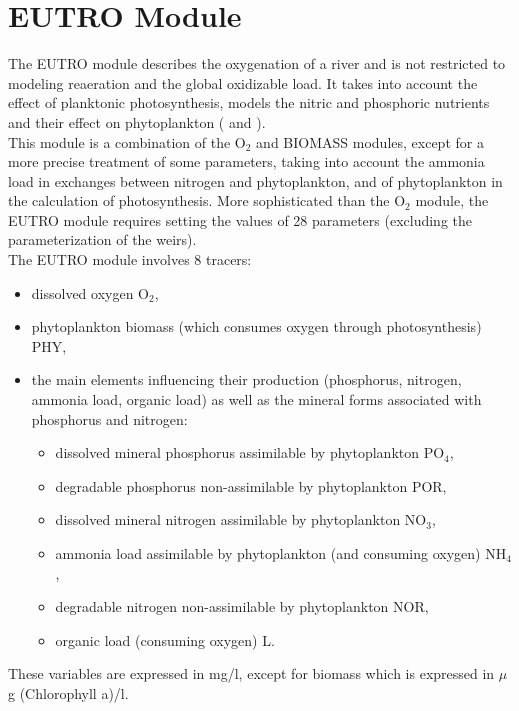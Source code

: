\chapter{EUTRO Module}

The EUTRO module describes the oxygenation of a river and
is not restricted to modeling reaeration and the global oxidizable load.
It takes into account the effect of planktonic photosynthesis,
models the nitric and phosphoric nutrients and their effect
on phytoplankton (\cite{gosse_doubs_1989} and \cite{gosse_doubs_1983}).\\

This module is a combination of the O$_2$ and BIOMASS modules,
except for a more precise treatment of some parameters,
taking into account the ammonia load in exchanges between nitrogen and phytoplankton,
and of phytoplankton in the calculation of photosynthesis.
More sophisticated than the O$_2$ module, the EUTRO module requires setting
the values of 28 parameters (excluding the parameterization of the weirs).\\

The EUTRO module involves 8 tracers:

\begin{itemize}
\item dissolved oxygen O$_2$,
\item phytoplankton biomass (which consumes oxygen through photosynthesis) PHY,
\item the main elements influencing their production
  (phosphorus, nitrogen, ammonia load, organic load)
  as well as the mineral forms associated with phosphorus and nitrogen:
\begin{itemize}
\item dissolved mineral phosphorus assimilable by phytoplankton PO$_4$,
\item degradable phosphorus non-assimilable by phytoplankton POR,
\item dissolved mineral nitrogen assimilable by phytoplankton NO$_3$,
\item ammonia load assimilable by phytoplankton (and consuming oxygen) NH$_4$,
\item degradable nitrogen non-assimilable by phytoplankton NOR,
\item organic load (consuming oxygen) L.
\end{itemize}
\end{itemize}


These variables are expressed in mg/l, except for biomass which is expressed in $\mu$g (Chlorophyll a)/l.\\

